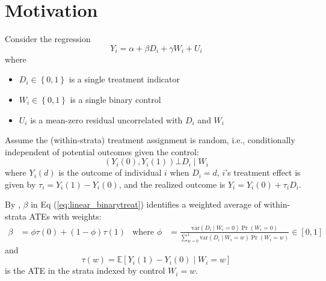 \documentclass[twoside]{article}
\begin{document}

\section{Motivation}
Consider the regression
\begin{equation}\label{eq:linear_binarytreat}
    Y_i = \alpha + \beta D_i + \gamma W_i + U_i
\end{equation}
where
\begin{itemize}
    \item $D_i\in\left\{ 0,1 \right\}$ is a single treatment indicator
    \item $W_i\in\left\{ 0,1 \right\}$ is a single binary control
    \item $U_i$ is a mean-zero residual uncorrelated with $D_i$ and $W_i$
\end{itemize}
Assume the (within-strata) treatment assignment is random, i.e., conditionally independent of potential outcomes given the control:
\begin{equation}\label{eq:conditional_indep}
    \left( Y_i(0),Y_i(1) \right) \bot D_i \mid W_i
\end{equation}
where $Y_i(d)$ is the outcome of individual $i$ when $D_i=d$, $i$'s treatment effect is given by $\tau_i = Y_i(1)-Y_i(0)$, and the realized outcome is $Y_i=Y_i(0)+\tau_i D_i$.

By \citet*{angrist1998estimating}, $\beta$ in Eq (\ref{eq:linear_binarytreat}) identifies a weighted average of within-strata ATEs with  weights:
\begin{align}\label{eq:angrist_weightedATE}
    \beta &= \phi \tau(0) + (1-\phi) \tau(1) &\text{where }\phi &= \frac{\mathrm{var}(D_i\mid W_i=0)\Pr (W_i=0)}{\sum_{w=0}^1 \mathrm{var}(D_i\mid W_i=w)\Pr (W_i=w)}\in[0,1]
\end{align}
and 
$$
\tau(w) = \mathbb{E}\left[ Y_i(1) - Y_i(0) \mid W_i=w\right]
$$
is the ATE in the strata indexed by control $W_i = w$.
\end{document}
